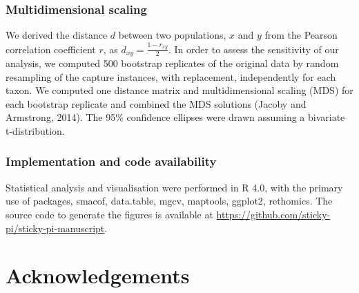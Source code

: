 \documentclass[12pt]{article}
\begin{document}
\begin{linenumbers}
		\subsubsection*{Multidimensional scaling}
		
		We derived the distance $d$ between two populations, $x$ and $y$ from the Pearson correlation coefficient $r$, as $d_{xy} = \frac{1 - r_{xy}}{2}$. In order to assess the sensitivity of our analysis, we computed 500 bootstrap replicates of the original data by random resampling of the capture instances, with replacement, independently for each taxon. We computed one distance matrix and multidimensional scaling (MDS) for each bootstrap replicate and combined the MDS solutions (Jacoby and Armstrong, 2014). The 95\% confidence ellipses were drawn assuming a bivariate t-distribution.
		
		\subsubsection*{Implementation and code availability}
		
		Statistical analysis and visualisation were performed in R 4.0\cite{r_core_team_r_2021}, with the primary use of packages, smacof\cite{leeuw_multidimensional_2009}, data.table\cite{dowle_datatable_2020}, mgcv\cite{wood_generalized_2017}, maptools\cite{bivand_maptools_2020}, ggplot2\cite{wickham_ggplot2_2016}, 
		rethomics\cite{geissmann_rethomics_2019}. 
		The source code to generate the figures is available at \href{https://github.com/sticky-pi/sticky-pi-manuscript}{https://github.com/sticky-pi/sticky-pi-manuscript}.
		
		
		\section*{Acknowledgements}
		{
			
}
\end{linenumbers}
\end{document}
